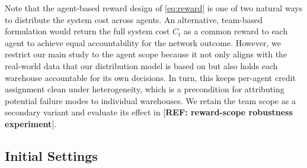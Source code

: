 Note that the agent-based reward design of \autoref{eq:reward} is one of two natural ways to distribute the system cost across agents. An alternative, team-based formulation would return the full system cost $C_t$ as a common reward to each agent to achieve equal accountability for the network outcome. However, we restrict our main study to the agent scope because it not only aligns with the real-world data that our distribution model is based on but also holds each warehouse accountable for its own decisions. In turn, this keeps per-agent credit assignment clean under heterogeneity, which is a precondition for attributing potential failure modes to individual warehouses. We retain the team scope as a secondary variant and evaluate its effect in [\textbf{REF: reward-scope robustness experiment}].\\

\subsection{Initial Settings}




